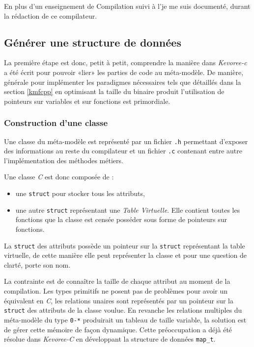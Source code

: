 En plus d'un enseignement de Compilation suivi à l'\univname je me suis documenté\cite{freeman2004head}, \cite{Appel2003MCI599718} durant la rédaction de ce compilateur.

\subsection{Générer une structure de données}

La première étape est donc, petit à petit, comprendre la manière dans \emph{Kevoree-c} a été écrit pour pouvoir «lier» les parties de code au méta-modèle. De manière, générale pour implémenter les paradigmes nécessaires tels que détaillés dans la section \ref{kmfcpp} en optimisant la taille du binaire produit l'utilisation de pointeurs sur variables et sur fonctions est primordiale.

\subsubsection{Construction d'une classe}

Une classe du méta-modèle est représenté par un fichier \texttt{.h} permettant d'exposer des informations au reste du compilateur et un fichier \texttt{.c} contenant entre autre l'implémentation des méthodes métiers.

Une classe \emph{C} est donc composée de :
\begin{itemize}
\item une \texttt{struct} pour stocker tous les attributs,
\item une autre \texttt{struct} représentant une \emph{Table Virtuelle}. Elle contient toutes les fonctions que la classe est censée posséder sous forme de pointeurs sur fonctions.
\end{itemize}

La \texttt{struct} des attributs possède un pointeur sur la \texttt{struct} représentant la table virtuelle, de cette manière elle peut représenter la classe et pour une question de clarté, porte son nom.

La contrainte est de connaître la taille de chaque attribut au moment de la compilation. Les types primitifs ne posent pas de problèmes pour avoir un équivalent en \emph{C}, les relations unaires sont représentés par un pointeur sur la \texttt{struct} des attributs de la classe voulue. En revanche les relations multiples du méta-modèle du type \texttt{0-*} produirait un tableau de taille variable, la solution est de gérer cette mémoire de façon dynamique. Cette préoccupation a déjà été résolue dans \emph{Kevoree-C} en développant la structure de données \texttt{map\_t}.

